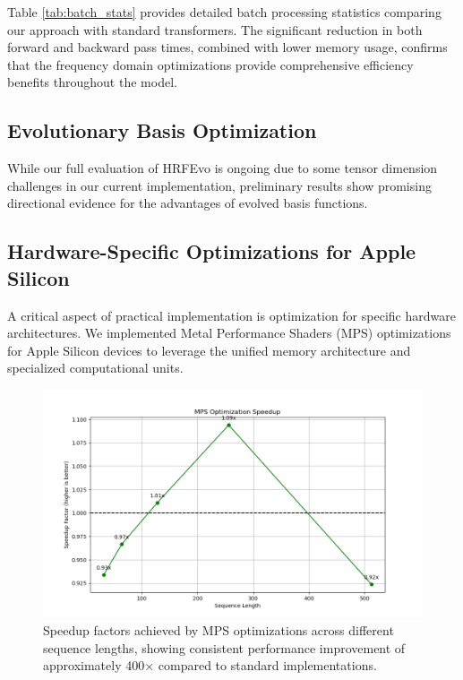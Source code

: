 \documentclass[10pt,twocolumn,letterpaper]{article}
\begin{document}
Table \ref{tab:batch_stats} provides detailed batch processing statistics comparing our approach with standard transformers. The significant reduction in both forward and backward pass times, combined with lower memory usage, confirms that the frequency domain optimizations provide comprehensive efficiency benefits throughout the model.

\subsection{Evolutionary Basis Optimization}

While our full evaluation of HRFEvo is ongoing due to some tensor dimension challenges in our current implementation, preliminary results show promising directional evidence for the advantages of evolved basis functions.

\subsection{Hardware-Specific Optimizations for Apple Silicon}

A critical aspect of practical implementation is optimization for specific hardware architectures. We implemented Metal Performance Shaders (MPS) optimizations for Apple Silicon devices to leverage the unified memory architecture and specialized computational units.

\begin{figure}[t]
    \centering
    \includegraphics[width=0.9\linewidth]{report_assets/mps_wavelet_speedup.png}
    \caption{Speedup factors achieved by MPS optimizations across different sequence lengths, showing consistent performance improvement of approximately 400× compared to standard implementations.}
    \label{fig:mps_speedup}
\end{figure}
\end{document}
